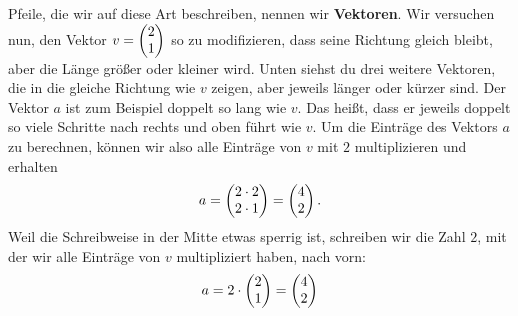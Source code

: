 \documentclass[../../main.tex]{subfiles}
\begin{document}
Pfeile, die wir auf diese Art beschreiben, nennen wir \textbf{Vektoren}. Wir versuchen nun, den Vektor $v=\begin{pmatrix} 2\\ 1 \end{pmatrix}$ 
so zu modifizieren, dass seine Richtung gleich bleibt, aber die Länge größer oder kleiner wird. Unten siehst du drei
weitere Vektoren, die in die gleiche Richtung wie $v$ zeigen, aber jeweils länger oder kürzer sind. Der Vektor $a$ ist
zum Beispiel doppelt so lang wie $v$. Das heißt, dass er jeweils doppelt so viele Schritte nach rechts und oben führt wie $v$.
Um die Einträge des Vektors $a$ zu berechnen, können wir also alle Einträge von $v$ mit $2$ 
multiplizieren und erhalten
\[a=\begin{pmatrix} 2\cdot 2\\ 2\cdot 1 \end{pmatrix}=\begin{pmatrix} 4\\ 2 \end{pmatrix}.\]
Weil die Schreibweise in der Mitte etwas sperrig ist, schreiben wir die Zahl $2$, mit der wir alle Einträge
von $v$ multipliziert haben, nach vorn:
\[a=2\cdot\begin{pmatrix} 2\\ 1 \end{pmatrix}=\begin{pmatrix} 4\\ 2 \end{pmatrix}\]
\end{document}

